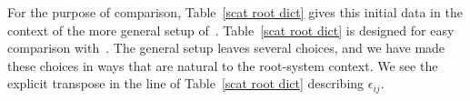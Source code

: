 \documentclass[ALCO,ThmDefs,Unicode,epreuves]{cedram}
\DeclareMathOperator{\uf}{uf}
\DeclareMathOperator{\Hom}{Hom}
\newcommand{\integers}{\mathbb Z}
\newcommand{\rationals}{\mathbb Q}
\newcommand{\set}[1]{{\left\lbrace #1 \right\rbrace}}
\newcommand{\br}[1]{{\langle #1 \rangle}}
\newcommand{\ck}{\spcheck}
\newcommand{\s}{\mathbf{s}}
\begin{document}
For the purpose of comparison, Table~\ref{scat root dict} gives this initial data in the context of the more general setup of~\cite{GHKK}.
Table~\ref{scat root dict} is designed for easy comparison with~\cite[Table~1]{scatfan}. 
The general setup leaves several choices, and we have made these choices in ways that are natural to the root-system context. 
We see the explicit transpose in the line of Table~\ref{scat root dict} describing $\epsilon_{ij}$.
\end{document}
